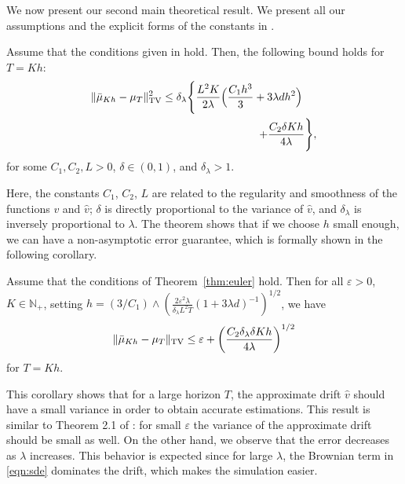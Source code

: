 We now present our second main theoretical result. We present all our assumptions and the explicit forms of the constants in \supp. 
\vspace{-5pt}
\begin{thm}
\label{thm:euler}
Assume that the conditions given in \supp{} hold. Then, the following bound holds for $T=Kh$:
\begin{align}
\nonumber \| \bar{\mu}_{Kh} - \mu_T \|_{\textnormal{TV}}^2 \leq \delta_\lambda \Biggl\{  \frac{L^2 K}{2\lambda} \Bigl( \frac{C_1 h^3}{3} + 3 \lambda d h^2 \Bigr) \hspace{13pt} \\ + \frac{C_2  \delta K h}{4\lambda} \Biggr\}	,
\end{align} 
for some $C_1,C_2,L >0$, $\delta \in (0,1)$, and $\delta_\lambda >1$.  %
\end{thm}
Here, the constants $C_1$, $C_2$, $L$ are related to the regularity and smoothness of the functions $v$ and $\hat{v}$; $\delta$ is directly proportional to the variance of $\hat{v}$, and $\delta_\lambda$ is inversely proportional to $\lambda$. The theorem shows that 
% 
if we choose $h$ small enough, we can have a non-asymptotic error guarantee, which is formally shown in the following corollary. 
\vspace{-5pt}
\begin{cor}
  \label{coro:precision}
  Assume that the conditions of Theorem~\ref{thm:euler} hold. Then for all $\varepsilon >0$, $K \in \mathbb{N}_+$, setting
$h = (3/C_1)\wedge\left(\frac{2 \varepsilon^2 \lambda}{\delta_\lambda L^2 T}(1+3\lambda d)^{-1}\right)^{1/2}$, %
  we have
  \begin{align}
    \| \bar{\mu}_{Kh} - \mu_T \|_{\textnormal{TV}} \leq \varepsilon + \left(\frac{C_2 \delta_\lambda \delta K h}{4\lambda}\right)^{1/2} 
  \end{align}
  for $T=Kh$.
\end{cor}
This corollary shows that for a large horizon $T$, the approximate drift $\hat{v}$ should have a small variance in order to obtain accurate estimations. This result is similar to Theorem 2.1 of \cite{raginsky17a}: for small $\varepsilon$ the variance of the approximate drift should be small as well. On the other hand, we observe that the error decreases as $\lambda$ increases. This behavior is expected since for large $\lambda$, the Brownian term in \eqref{eqn:sde} dominates the drift, which makes the simulation easier.
